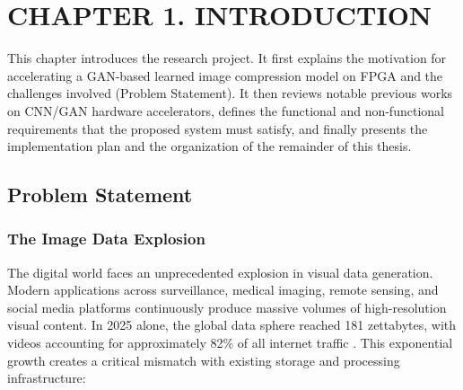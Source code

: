 \section*{CHAPTER 1. INTRODUCTION}
\setcounter{section}{1}
\setcounter{subsection}{0}
\setcounter{subsubsection}{0}
\setcounter{figure}{0}
\setcounter{table}{0}

This chapter introduces the research project. It first explains the motivation for accelerating a GAN-based learned image compression model on FPGA and the challenges involved (Problem Statement). It then reviews notable previous works on CNN/GAN hardware accelerators, defines the functional and non-functional requirements that the proposed system must satisfy, and finally presents the implementation plan and the organization of the remainder of this thesis.

\subsection{Problem Statement}

\subsubsection*{The Image Data Explosion}

The digital world faces an unprecedented explosion in visual data generation. Modern applications across surveillance, medical imaging, remote sensing, and social media platforms continuously produce massive volumes of high-resolution visual content. In 2025 alone, the global data sphere reached 181 zettabytes, with videos accounting for approximately 82\% of all internet traffic \cite{explodingtopics2025}. This exponential growth creates a critical mismatch with existing storage and processing infrastructure:

